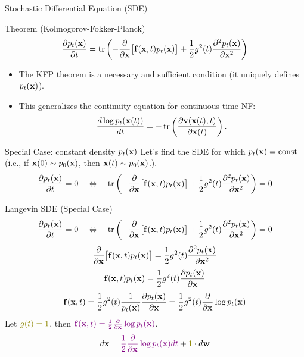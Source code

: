 \documentclass{beamer}
\begin{document}
\begin{frame}{Stochastic Differential Equation (SDE)}
	\begin{block}{Theorem (Kolmogorov-Fokker-Planck)}
		\vspace{-0.2cm}
		\[
			\frac{\partial p_t(\mathbf{x})}{\partial t} = \operatorname{tr}\left( - \frac{\partial}{\partial \mathbf{x}} \bigl[ \mathbf{f}(\mathbf{x}, t) p_t(\mathbf{x})\bigr] + \frac{1}{2} g^2(t) \frac{\partial^2 p_t(\mathbf{x})}{\partial \mathbf{x}^2}\right)
		\]
		\vspace{-0.2cm}
	\end{block}
	\begin{itemize}
		\item The KFP theorem is a necessary and sufficient condition (it uniquely defines $p_t(\mathbf{x})$).
		\item This generalizes the continuity equation for continuous-time NF:
		\[
			\frac{d \log p_t(\mathbf{x}(t))}{d t} = - \operatorname{tr} \left( \frac{\partial \mathbf{v}(\mathbf{x}(t), t)}{\partial \mathbf{x}(t)} \right).
		\]
	\end{itemize}
	\eqpause
	\begin{block}{Special Case: constant density $p_t(\mathbf{x})$}
		Let's find the SDE for which $p_t(\mathbf{x}) = \text{const}$ (i.e., if $\mathbf{x}(0) \sim p_0(\mathbf{x})$, then $\mathbf{x}(t) \sim p_0(\mathbf{x})$.).
		\eqpause
		\[
			\frac{\partial p_t(\mathbf{x})}{\partial t} = 0 \quad \Leftrightarrow \quad \operatorname{tr}\left( - \frac{\partial}{\partial \mathbf{x}} \bigl[ \mathbf{f}(\mathbf{x}, t) p_t(\mathbf{x})\bigr] + \frac{1}{2} g^2(t) \frac{\partial^2 p_t(\mathbf{x})}{\partial \mathbf{x}^2}\right) = 0
		\]
	\end{block}
\end{frame}
\begin{frame}{Langevin SDE (Special Case)}
	\[
		\frac{\partial p_t(\mathbf{x})}{\partial t} = 0 \quad \Leftrightarrow \quad \operatorname{tr}\left( - \frac{\partial}{\partial \mathbf{x}} \bigl[ \mathbf{f}(\mathbf{x}, t) p_t(\mathbf{x})\bigr] + \frac{1}{2} g^2(t) \frac{\partial^2 p_t(\mathbf{x})}{\partial \mathbf{x}^2}\right) = 0
	\]
	\vspace{-0.3cm}
	\eqpause
	\[
		\frac{\partial}{\partial \mathbf{x}} \bigl[ \mathbf{f}(\mathbf{x}, t) p_t(\mathbf{x})\bigr] = \frac{1}{2} g^2(t) \frac{\partial^2 p_t(\mathbf{x})}{\partial \mathbf{x}^2}
	\]
	\eqpause
	\[
		\mathbf{f}(\mathbf{x}, t) p_t(\mathbf{x}) = \frac{1}{2} g^2(t) \frac{\partial p_t(\mathbf{x})}{\partial \mathbf{x}}
	\]
	\eqpause
	\[
		\mathbf{f}(\mathbf{x}, t) = \frac{1}{2} g^2(t) \frac{1}{p_t(\mathbf{x})}\frac{\partial p_t(\mathbf{x})}{\partial \mathbf{x}} = \frac{1}{2} g^2(t) \frac{\partial}{\partial \mathbf{x}} \log p_t(\mathbf{x})
	\]
	\eqpause
	Let ${\color{olive}g(t)=1}$, then ${\color{violet}\mathbf{f}(\mathbf{x}, t) = \frac{1}{2} \frac{\partial}{\partial \mathbf{x}} \log p_t(\mathbf{x})}$.
	\[
		d \bx = {\color{violet}\frac{1}{2} \frac{\partial}{\partial \bx} \log p_t(\bx) d t} + {\color{olive}1} \cdot d \bw
	\]
\end{frame}
\end{document}
